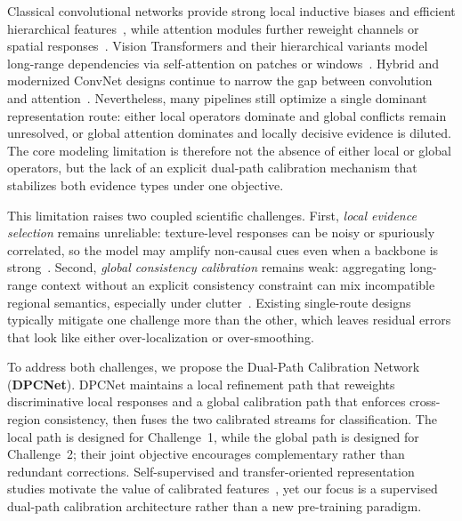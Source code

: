 \documentclass[11pt,a4paper]{article}
\begin{document}
Classical convolutional networks provide strong local inductive biases and efficient hierarchical features~\cite{simonyan2015vgg,szegedy2015googlenet,huang2017densenet,xie2017resnext,tan2019efficientnet}, while attention modules further reweight channels or spatial responses~\cite{hu2018senet,woo2018cbam,wang2020eca}.
Vision Transformers and their hierarchical variants model long-range dependencies via self-attention on patches or windows~\cite{dosovitskiy2021vit,liu2021swin,touvron2021deit,wang2021pvt,liu2022swinv2}.
Hybrid and modernized ConvNet designs continue to narrow the gap between convolution and attention~\cite{liu2022convnext,woo2023convnextv2,li2022mvitv2}.
Nevertheless, many pipelines still optimize a single dominant representation route: either local operators dominate and global conflicts remain unresolved, or global attention dominates and locally decisive evidence is diluted.
The core modeling limitation is therefore not the absence of either local or global operators, but the lack of an explicit dual-path calibration mechanism that stabilizes both evidence types under one objective.

This limitation raises two coupled scientific challenges.
First, \emph{local evidence selection} remains unreliable: texture-level responses can be noisy or spuriously correlated, so the model may amplify non-causal cues even when a backbone is strong~\cite{selvaraju2017gradcam}.
Second, \emph{global consistency calibration} remains weak: aggregating long-range context without an explicit consistency constraint can mix incompatible regional semantics, especially under clutter~\cite{vaswani2017attention,dosovitskiy2021vit}.
Existing single-route designs typically mitigate one challenge more than the other, which leaves residual errors that look like either over-localization or over-smoothing.

To address both challenges, we propose the Dual-Path Calibration Network (\textbf{DPCNet}).
DPCNet maintains a local refinement path that reweights discriminative local responses and a global calibration path that enforces cross-region consistency, then fuses the two calibrated streams for classification.
The local path is designed for Challenge~1, while the global path is designed for Challenge~2; their joint objective encourages complementary rather than redundant corrections.
Self-supervised and transfer-oriented representation studies motivate the value of calibrated features~\cite{chen2020simclr,he2020moco,grill2020byol,caron2021dino,he2022mae,radford2021clip}, yet our focus is a supervised dual-path calibration architecture rather than a new pre-training paradigm.
\end{document}
